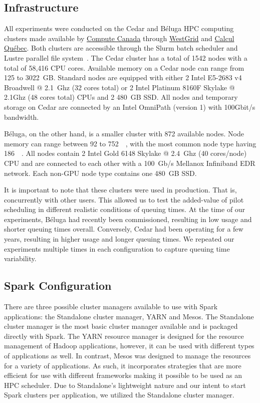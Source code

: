 	\subsection{Infrastructure}
	All experiments were conducted on the Cedar and B\'eluga HPC computing
	clusters made available by \href{https://www.computecanada.ca}{Compute
	Canada} through \href{https://www.westgrid.ca}{WestGrid} and
	\href{http://www.calculquebec.ca}{Calcul Qu\'ebec}. Both clusters are
	accessible through the Slurm batch scheduler and Lustre parallel file
	system~\cite{schwan2003lustre}. The Cedar cluster has a total of 1542
	nodes with a total of 58,416 CPU cores. Available memory on a Cedar node
	can range from 125 to 3022~GB. Standard nodes are equipped with either 2
	Intel E5-2683 v4 Broadwell @ 2.1~Ghz (32 cores total) or 2 Intel
	Platinum 8160F Skylake @ 2.1Ghz (48 cores total) CPUs and 2 480~GB SSD.
	All nodes and temporary storage on Cedar are connected by an Intel
	OmniPath (version 1) with 100Gbit/s bandwidth.
    
	B\'eluga, on the other hand, is a smaller cluster with 872 available
	nodes. Node memory can range between 92 to \SI{752}{\giga\byte}, with
	the most common node type having \SI{186}{\giga\byte}. All nodes contain
	2 Intel Gold 6148 Skylake @ 2.4~Ghz (40 cores/node) CPU and are
	connected to each other with a 100~Gb/s Mellanox Infiniband EDR network.
	Each non-GPU node type contains one 480~GB SSD. 
    
	It is important to note that these clusters were used in production.
	That is, concurrently with other users. This allowed us to test the
	added-value of pilot scheduling in different realistic conditions of
	queuing times. At the time of our experiments, B\'eluga had recently
	been commissioned, resulting in low usage and shorter queuing times
	overall. Conversely, Cedar had been operating for a few years, resulting
	in higher usage and longer queuing times. We repeated our experiments
	multiple times in each configuration to capture queuing time
	variability.
    
	\subsection{Spark Configuration}
    
	There are three possible cluster managers available to use with Spark
	applications: the Standalone cluster manager, YARN and Mesos. The
	Standalone cluster manager is the most basic cluster manager available
	and is packaged directly with Spark. The YARN resource manager is
	designed for the resource management of Hadoop applications, however, it
	can be used with different types of applications as well. In contrast,
	Mesos was designed to manage the resources for a variety of
	applications. As such, it incorporates strategies that are more
	efficient for use with different frameworks making it possible to be
	used as an HPC scheduler. Due to Standalone's lightweight nature and our
	intent to start Spark clusters per application, we utilized the
	Standalone cluster manager.
    
